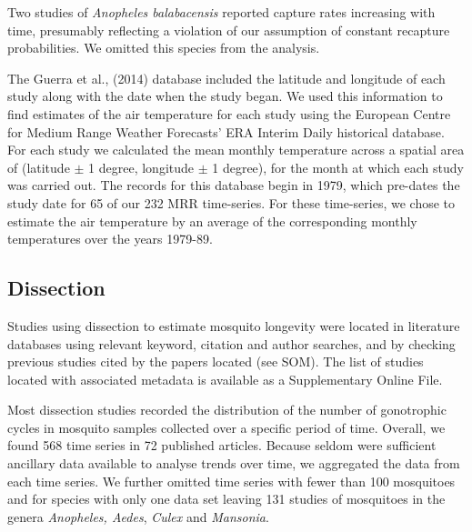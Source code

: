 \documentclass[]{article}
\begin{document}
Two studies of \emph{Anopheles balabacensis} reported capture rates
increasing with time, presumably reflecting a violation of our
assumption of constant recapture probabilities. We omitted this species
from the analysis.

The Guerra et al., (2014) database included the latitude and longitude of each
study along with the date when the study began. We used this information to find
estimates of the air temperature for each study using the European Centre for Medium
Range Weather Forecasts' ERA Interim Daily historical database. For each
study we calculated the mean monthly temperature across a spatial area
of (latitude $\pm$ 1 degree, longitude $\pm$ 1 degree), for the month at which
each study was carried out. The records for this database begin in 1979,
which pre-dates the study date for 65 of our 232 MRR time-series. For
these time-series, we chose to estimate the air temperature by an
average of the corresponding monthly temperatures over the years
1979-89.

\subsection{Dissection}\label{dissection}

Studies using dissection to estimate mosquito longevity were located in
literature databases using relevant keyword, citation and author
searches, and by checking previous studies cited by the papers located
(see SOM). The list of studies located with associated metadata is
available as a Supplementary Online File.

Most dissection studies recorded the distribution of the number of
gonotrophic cycles in mosquito samples collected over a specific period
of time. Overall, we found 568 time series in 72 published articles.
Because seldom were sufficient ancillary data available to analyse
trends over time, we aggregated the data from each time series. We
further omitted time series with fewer than 100 mosquitoes and for
species with only one data set leaving 131 studies of mosquitoes in the
genera \emph{Anopheles, Aedes}, \emph{Culex} and \emph{Mansonia}.
\end{document}
